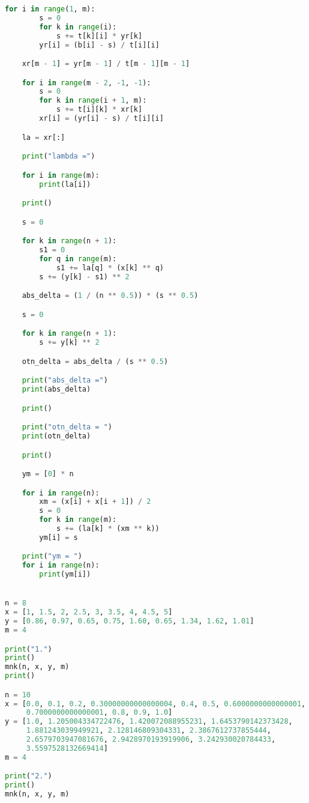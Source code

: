 \documentclass [12pt]{article}
\begin{document}
\begin{lstlisting}[language=python]
    for i in range(1, m):
        s = 0
        for k in range(i):
            s += t[k][i] * yr[k]
        yr[i] = (b[i] - s) / t[i][i]

    xr[m - 1] = yr[m - 1] / t[m - 1][m - 1]

    for i in range(m - 2, -1, -1):
        s = 0
        for k in range(i + 1, m):
            s += t[i][k] * xr[k]
        xr[i] = (yr[i] - s) / t[i][i]

    la = xr[:]

    print("lambda =")

    for i in range(m):
        print(la[i])

    print()

    s = 0

    for k in range(n + 1):
        s1 = 0
        for q in range(m):
            s1 += la[q] * (x[k] ** q)
        s += (y[k] - s1) ** 2

    abs_delta = (1 / (n ** 0.5)) * (s ** 0.5)

    s = 0

    for k in range(n + 1):
        s += y[k] ** 2

    otn_delta = abs_delta / (s ** 0.5)

    print("abs_delta =")
    print(abs_delta)

    print()

    print("otn_delta = ")
    print(otn_delta)

    print()

    ym = [0] * n

    for i in range(n):
        xm = (x[i] + x[i + 1]) / 2
        s = 0
        for k in range(m):
            s += (la[k] * (xm ** k))
        ym[i] = s

    print("ym = ")
    for i in range(n):
        print(ym[i])


n = 8
x = [1, 1.5, 2, 2.5, 3, 3.5, 4, 4.5, 5]
y = [0.86, 0.97, 0.65, 0.75, 1.60, 0.65, 1.34, 1.62, 1.01]
m = 4

print("1.")
print()
mnk(n, x, y, m)
print()

n = 10
x = [0.0, 0.1, 0.2, 0.30000000000000004, 0.4, 0.5, 0.6000000000000001,
     0.7000000000000001, 0.8, 0.9, 1.0]
y = [1.0, 1.205004334722476, 1.420072088955231, 1.6453790142373428,
     1.881243039949921, 2.128146809304331, 2.3867612737855444,
     2.6579703947081676, 2.9428970193919906, 3.242930020784433,
     3.5597528132669414]
m = 4

print("2.")
print()
mnk(n, x, y, m)

\end{lstlisting}
\end{document}
